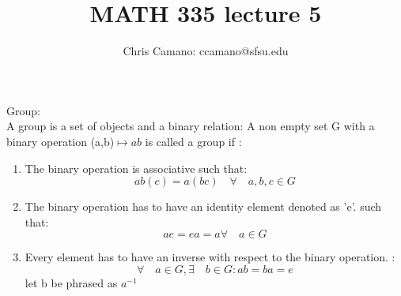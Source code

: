 \documentclass[11pt]{article}
\author{Chris Camano: ccamano@sfsu.edu}
\title{MATH 335  lecture 5 }
\date
\theoremstyle{definition}  %
\begin{document}
\maketitle
{} Group: \\
A group is a set of objects and a binary relation: A  non empty set G with a binary operation (a,b)$\mapsto ab$ is called a group if :
\begin{enumerate}
  \item The binary operation is associative such that:
  \[
    ab(c)=a(bc)\quad \forall \quad a,b,c \in G
  \]
  \item
  The binary operation has to have an identity element denoted as 'e'. such that:
\[
  ae=ea=a \forall \quad a \in G
\]
  \item
  Every element has to have an inverse with respect to the binary operation. :
  \[
    \forall \quad a \in G , \exists\quad  b \in G : ab=ba=e
  \]
  let b be phrased as $a^{-1}$
\end{enumerate}
\end{document}
